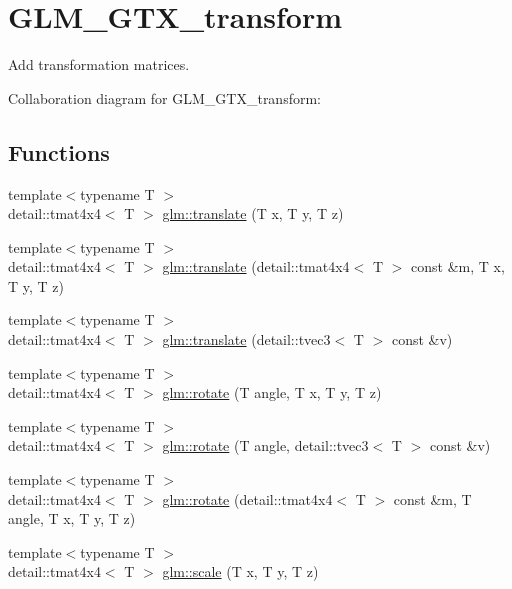 \hypertarget{group__gtx__transform}{}\section{G\+L\+M\+\_\+\+G\+T\+X\+\_\+transform}
\label{group__gtx__transform}


Add transformation matrices.  


Collaboration diagram for G\+L\+M\+\_\+\+G\+T\+X\+\_\+transform\+:
\subsection*{Functions}
\begin{DoxyCompactItemize}
\item 
{\footnotesize template$<$typename T $>$ }\\detail\+::tmat4x4$<$ T $>$ \hyperlink{group__gtx__transform_ga353b66810f6788c6486197cb6a30248c}{glm\+::translate} (T x, T y, T z)
\item 
{\footnotesize template$<$typename T $>$ }\\detail\+::tmat4x4$<$ T $>$ \hyperlink{group__gtx__transform_gaba8fdcaf3cbd37c131b2880116749273}{glm\+::translate} (detail\+::tmat4x4$<$ T $>$ const \&m, T x, T y, T z)
\item 
{\footnotesize template$<$typename T $>$ }\\detail\+::tmat4x4$<$ T $>$ \hyperlink{group__gtx__transform_gae65c5f45d880bf921b2af669b97a8fa8}{glm\+::translate} (detail\+::tvec3$<$ T $>$ const \&v)
\item 
{\footnotesize template$<$typename T $>$ }\\detail\+::tmat4x4$<$ T $>$ \hyperlink{group__gtx__transform_ga5457db4563fa9c0195d4097f9e788617}{glm\+::rotate} (T angle, T x, T y, T z)
\item 
{\footnotesize template$<$typename T $>$ }\\detail\+::tmat4x4$<$ T $>$ \hyperlink{group__gtx__transform_ga9a123708926335a4c097eee1157d4791}{glm\+::rotate} (T angle, detail\+::tvec3$<$ T $>$ const \&v)
\item 
{\footnotesize template$<$typename T $>$ }\\detail\+::tmat4x4$<$ T $>$ \hyperlink{group__gtx__transform_ga3eed13fc5bcaff2f2204b12013bb83bf}{glm\+::rotate} (detail\+::tmat4x4$<$ T $>$ const \&m, T angle, T x, T y, T z)
\item 
{\footnotesize template$<$typename T $>$ }\\detail\+::tmat4x4$<$ T $>$ \hyperlink{group__gtx__transform_ga7ffcdedf36bf2491505845f9d43276ae}{glm\+::scale} (T x, T y, T z)

\end{DoxyCompactItemize}
